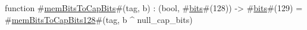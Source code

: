 function #\hyperref[zmemBitsToCapBits]{memBitsToCapBits}#(tag, b) : (bool, #\hyperref[zbits]{bits}#(128)) -> #\hyperref[zbits]{bits}#(129) =
  #\hyperref[zmemBitsToCapBitsonetwoeight]{memBitsToCapBits128}#(tag, b ^ null_cap_bits)
